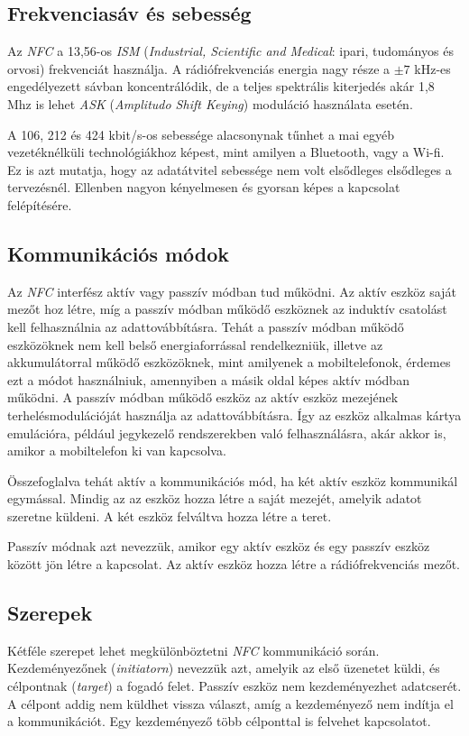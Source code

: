 \documentclass[12pt]{article}
\begin{document}
\subsection{Frekvenciasáv és sebesség}
Az \emph{NFC} a 13,56-os \emph{ISM} (\emph{Industrial, Scientific and Medical}: 
ipari, tudományos
és orvosi) frekvenciát használja. A rádiófrekvenciás energia nagy része a 
$\pm 7$ kHz-es engedélyezett sávban koncentrálódik, de a teljes spektrális 
kiterjedés akár 1,8 Mhz is lehet \emph{ASK} (\emph{Amplitudo Shift Keying})
moduláció használata esetén.

A 106, 212 és 424 kbit/s-os sebessége alacsonynak tűnhet a mai egyéb
vezetéknélküli technológiákhoz képest, mint amilyen a Bluetooth, vagy a Wi-fi.
Ez is azt mutatja, hogy az adatátvitel sebessége nem volt elsődleges elsődleges
a tervezésnél. Ellenben nagyon kényelmesen és gyorsan képes a kapcsolat
felépítésére.

\subsection{Kommunikációs módok}
Az \emph{NFC} interfész aktív vagy passzív módban tud működni. Az aktív eszköz saját
mezőt hoz létre, míg a passzív módban működő eszköznek az induktív csatolást
kell felhasználnia az adattovábbításra. Tehát a passzív módban működő eszközöknek
nem kell belső energiaforrással rendelkezniük, illetve az akkumulátorral működő
eszközöknek, mint amilyenek a mobiltelefonok, érdemes ezt a módot használniuk, 
amennyiben a másik oldal képes aktív módban működni. A passzív módban működő
eszköz az aktív eszköz mezejének terhelésmodulációját használja az
adattovábbításra. Így az eszköz alkalmas kártya emulációra, például 
jegykezelő rendszerekben való felhasználásra, akár  akkor is, amikor a mobiltelefon
ki van kapcsolva.

Összefoglalva tehát aktív a kommunikációs mód, ha két aktív eszköz kommunikál 
egymással. Mindig az az eszköz hozza létre a saját mezejét, amelyik adatot
szeretne küldeni. A két eszköz felváltva hozza létre a teret.

Passzív módnak azt nevezzük, amikor egy aktív eszköz és egy passzív eszköz között
jön létre a kapcsolat. Az aktív eszköz hozza létre a rádiófrekvenciás mezőt.

\subsection{Szerepek}
Kétféle szerepet lehet megkülönböztetni \emph{NFC} kommunikáció során. Kezdeményezőnek 
(\emph{initiatorn}) nevezzük azt, amelyik az első üzenetet küldi, és célpontnak 
(\emph{target})
a fogadó felet. Passzív eszköz nem kezdeményezhet adatcserét. A célpont addig 
nem küldhet vissza választ, amíg a kezdeményező nem indítja el a kommunikációt.
Egy kezdeményező több célponttal is felvehet kapcsolatot.
\end{document}
